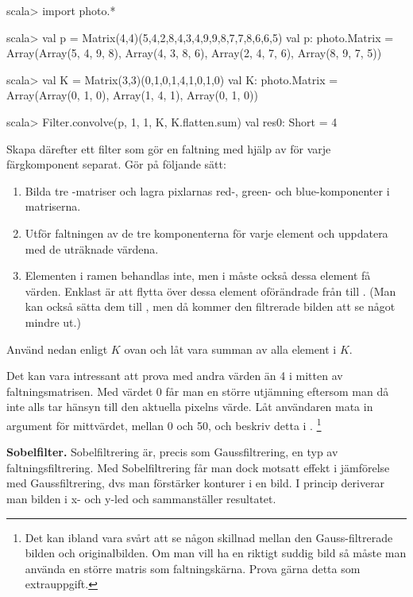 \begin{REPLnonum}
scala> import photo.*

scala> val p = Matrix(4,4)(5,4,2,8,4,3,4,9,9,8,7,7,8,6,6,5)
val p: photo.Matrix = Array(Array(5, 4, 9, 8), Array(4, 3, 8, 6), Array(2, 4, 7, 6), Array(8, 9, 7, 5))

scala> val K = Matrix(3,3)(0,1,0,1,4,1,0,1,0)
val K: photo.Matrix = Array(Array(0, 1, 0), Array(1, 4, 1), Array(0, 1, 0))

scala> Filter.convolve(p, 1, 1, K, K.flatten.sum)
val res0: Short = 4
\end{REPLnonum}

Skapa därefter ett filter  som gör en faltning med hjälp av  för varje färgkomponent separat. Gör på följande sätt:
\begin{enumerate}
	\item Bilda tre -matriser och lagra pixlarnas red-, green- och blue-komponenter i matriserna.
	\item Utför faltningen av de tre komponenterna för varje element och uppdatera  med de uträknade värdena.
	\item Elementen i ramen behandlas inte, men i  måste också dessa element få värden. Enklast är att flytta över dessa element oförändrade från  till . (Man kan också sätta dem till , men då kommer den filtrerade bilden att se något mindre ut.)
\end{enumerate}

Använd nedan  enligt $K$ ovan och låt  vara summan av alla element i $K$. 

Det kan vara intressant att prova med andra värden än 4 i mitten av faltningsmatrisen. Med värdet 0 får man en större utjämning eftersom man då inte alls tar hänsyn till den aktuella pixelns värde. Låt användaren mata in argument för mittvärdet, mellan 0 och 50, och beskriv detta i . \footnote{Det kan ibland vara svårt att se någon skillnad mellan den Gauss-filtrerade bilden och originalbilden. Om man vill ha en riktigt suddig bild så måste man använda en större matris som faltningskärna. Prova gärna detta som extrauppgift. }


\Task  \textbf{Sobelfilter.} Sobelfiltrering är, precis som Gaussfiltrering, en typ av faltningsfiltrering. Med Sobelfiltrering får man dock motsatt effekt i jämförelse med Gaussfiltrering, dvs man förstärker konturer i en bild. I princip deriverar man bilden i x- och y-led och sammanställer resultatet.

